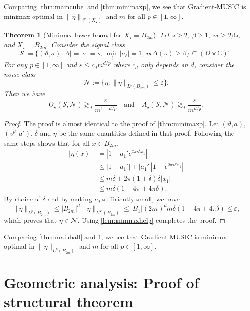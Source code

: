 \documentclass[11pt]{article}
\newtheorem{theorem}{Theorem}
\theoremstyle{definition}
\numberwithin{theorem}{section}
\numberwithin{lemma}{section}
\numberwithin{equation}{section}
\def\C{\mathbb{C}}
\renewcommand{\subset}{\subseteq}
\renewcommand{\epsilon}{\varepsilon}
\newcommand{\bfa}{a}
\newcommand{\calS}{\mathcal{S}}
\newcommand{\calN}{\mathcal{N}}
\def\andspace{\quad\text{and}\quad}
\numberwithin{equation}{section}
\begin{document}
	Comparing \cref{thm:maincube} and \cref{thm:minimaxp}, we see that Gradient-MUSIC is minimax optimal in $\|\eta\|_{\ell^p(X_\star)}$ and $m$ for all $p\in [1,\infty]$.
	
	\begin{theorem}[Minimax lower bound for $X_\star = B_{2m}$]
		\label{thm:minimaxp2}
		Let $s\geq 2$, $\beta\geq 1$, $m\geq 2\beta s$, and $X_\star = B_{2m}$. Consider the signal class
		$$
		\calS:=\big\{(\vartheta,\bfa) \colon |\vartheta|=|\bfa|=s, \, \min_\ell |a_\ell|=1, \, m\Delta(\vartheta)\geq \beta \big\}\subset (\Omega\times \C)^s. 
		$$
		For any $p\in [1,\infty]$ and $\epsilon\leq c_d m^{d/p}$ where $c_d$ only depends on $d$, consider the noise class
		$$
		\calN:= \{\eta\colon \|\eta\|_{L^p(B_{2m})}\leq \epsilon\}.
		$$
		Then we have
		\begin{equation*}
			\Theta_\star(\calS,\calN) \gtrsim_d \frac{\epsilon}{ m^{1+d/p}} \andspace
			A_\star(\calS,\calN)  \gtrsim_d \frac{\epsilon}{m^{d/p}}.
		\end{equation*}
	\end{theorem}
	
	\begin{proof}
		The proof is almost identical to the proof of \cref{thm:minimaxp}. Let $(\vartheta,a)$, $(\vartheta',a')$, $\delta$ and $\eta$ be the same quantities defined in that proof. Following the same steps shows that for all $x\in B_{2m}$, 
		\begin{align*}
			|\eta(x)| 
			&= |1 - a_1'  e^{2\pi i \delta x_1}| \\
			&\leq |1-a_1'| + |a_1'| |1- e^{2\pi i \delta x_1} | \\
			&\leq m \delta + 2\pi (1+\delta) \delta |x_1| \\
			&\leq m \delta (1+4\pi + 4\pi \delta).
		\end{align*}
		By choice of $\delta$ and by making $c_d$ sufficiently small, we have
		$$
		\|\eta\|_{L^p(B_{2m})}
		\leq |B_{2m}|^d \|\eta\|_{L^\infty(B_{2m})}
		\leq |B_1| (2m)^d  m \delta (1+4\pi + 4\pi \delta)
		\leq \epsilon,
		$$
		which proves that $\eta\in \calN$. Using \cref{lem:minmaxhelp} completes the proof.
	\end{proof}
	
	Comparing \cref{thm:mainball} and \cref{thm:minimaxp2}, we see that Gradient-MUSIC is minimax optimal in $\|\eta\|_{L^p(B_{2m})}$ and $m$ for all $p\in [1,\infty]$.

	
	\section{Geometric analysis: Proof of structural theorem}
	\label{sec:geometricanalysis}
	
\end{document}
